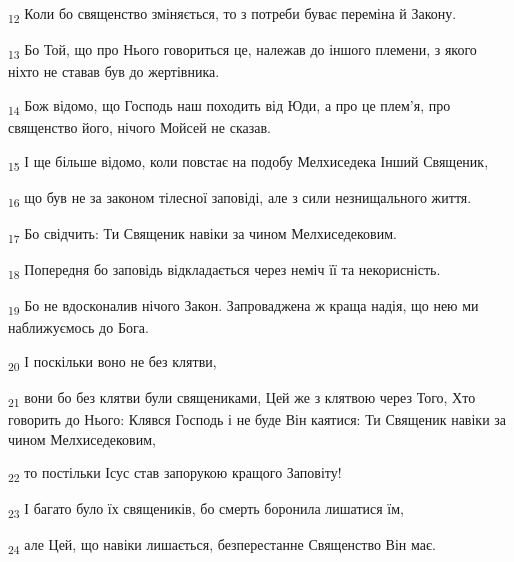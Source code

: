 \begin{tcolorbox}
\textsubscript{12} Коли бо священство зміняється, то з потреби буває переміна й Закону.
\end{tcolorbox}
\begin{tcolorbox}
\textsubscript{13} Бо Той, що про Нього говориться це, належав до іншого племени, з якого ніхто не ставав був до жертівника.
\end{tcolorbox}
\begin{tcolorbox}
\textsubscript{14} Бож відомо, що Господь наш походить від Юди, а про це плем'я, про священство його, нічого Мойсей не сказав.
\end{tcolorbox}
\begin{tcolorbox}
\textsubscript{15} І ще більше відомо, коли повстає на подобу Мелхиседека Інший Священик,
\end{tcolorbox}
\begin{tcolorbox}
\textsubscript{16} що був не за законом тілесної заповіді, але з сили незнищального життя.
\end{tcolorbox}
\begin{tcolorbox}
\textsubscript{17} Бо свідчить: Ти Священик навіки за чином Мелхиседековим.
\end{tcolorbox}
\begin{tcolorbox}
\textsubscript{18} Попередня бо заповідь відкладається через неміч її та некорисність.
\end{tcolorbox}
\begin{tcolorbox}
\textsubscript{19} Бо не вдосконалив нічого Закон. Запроваджена ж краща надія, що нею ми наближуємось до Бога.
\end{tcolorbox}
\begin{tcolorbox}
\textsubscript{20} І поскільки воно не без клятви,
\end{tcolorbox}
\begin{tcolorbox}
\textsubscript{21} вони бо без клятви були священиками, Цей же з клятвою через Того, Хто говорить до Нього: Клявся Господь і не буде Він каятися: Ти Священик навіки за чином Мелхиседековим,
\end{tcolorbox}
\begin{tcolorbox}
\textsubscript{22} то постільки Ісус став запорукою кращого Заповіту!
\end{tcolorbox}
\begin{tcolorbox}
\textsubscript{23} І багато було їх священиків, бо смерть боронила лишатися їм,
\end{tcolorbox}
\begin{tcolorbox}
\textsubscript{24} але Цей, що навіки лишається, безперестанне Священство Він має.
\end{tcolorbox}
